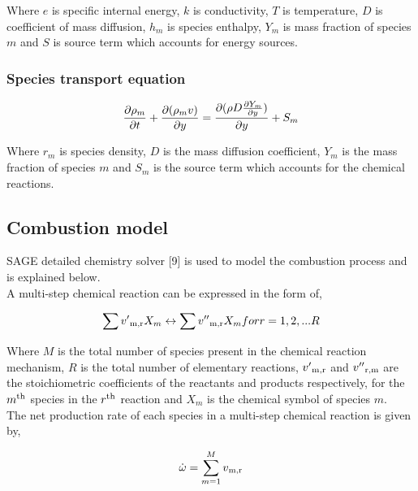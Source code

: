 \documentclass[conference]{IEEEtran}
\begin{document}
Where $e$ is specific internal energy, $k$ is conductivity, $T$ is temperature, $D$ is coefficient of mass diffusion, $h_m$ is species enthalpy, $Y_m$ is mass fraction of species $m$ and $S$ is source term which accounts for energy sources.\\

\subsubsection{Species transport equation}

    \begin{gather*}
        \pdv{\rho_m}{t} + \pdv{(\rho_m v)}{y} = \pdv{(\rho D \pdv{Y_m}{y})}{y} +  S_m
    \end{gather*}

Where $r_m$ is species density, $D$ is the mass diffusion coefficient, $Y_m$ is the mass fraction of species $m$ and $S_m$ is the source term which accounts for the chemical reactions.\\

\subsection{Combustion model}
SAGE detailed chemistry solver [9] is used to model the combustion process and is explained below. \\

A multi-step chemical reaction can be expressed in the form of,

\begin{gather*}
    \sum v'\textsubscript{m,r} X_m \leftrightarrow \sum v''\textsubscript{m,r} X_m for  r = 1,2,...R
\end{gather*}

Where $M$ is the total number of species present in the chemical reaction mechanism, $R$ is the total number of elementary reactions, $v'\textsubscript{m,r}$ and $v''\textsubscript{r,m}$ are the stoichiometric coefficients of the reactants and products respectively, for the $m\textsuperscript{th}$ species in the $r\textsuperscript{th}$ reaction and $X_m$ is the chemical symbol of species $m$.\\

The net production rate of each species in a multi-step chemical reaction is given by,

\begin{gather*}
    \dot\omega = \sum_{m=1}^{M} v\textsubscript{m,r} 
\end{gather*}
\end{document}
